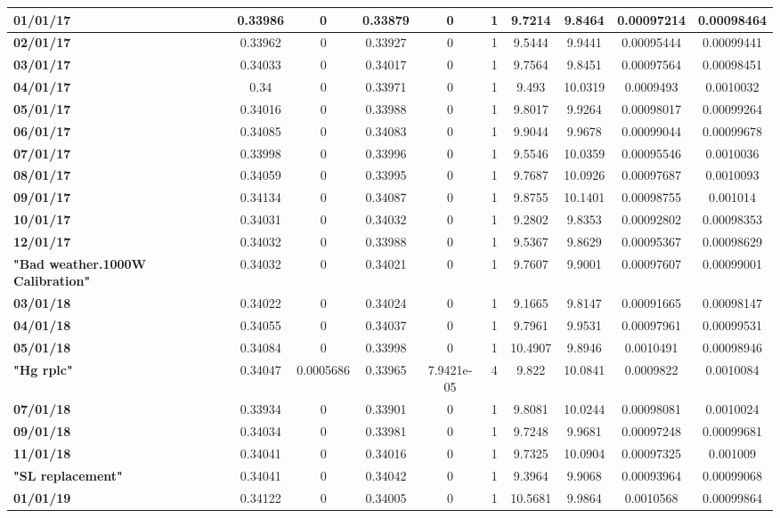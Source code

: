 {\begin{tabular}{lccccccccc}
\textbf{01/01/17}&0.33986&0&0.33879&0&1&9.7214&9.8464&0.00097214&0.00098464\\\midrule
\textbf{02/01/17}&0.33962&0&0.33927&0&1&9.5444&9.9441&0.00095444&0.00099441\\\midrule
\textbf{03/01/17}&0.34033&0&0.34017&0&1&9.7564&9.8451&0.00097564&0.00098451\\\midrule
\textbf{04/01/17}&0.34&0&0.33971&0&1&9.493&10.0319&0.0009493&0.0010032\\\midrule
\textbf{05/01/17}&0.34016&0&0.33988&0&1&9.8017&9.9264&0.00098017&0.00099264\\\midrule
\textbf{06/01/17}&0.34085&0&0.34083&0&1&9.9044&9.9678&0.00099044&0.00099678\\\midrule
\textbf{07/01/17}&0.33998&0&0.33996&0&1&9.5546&10.0359&0.00095546&0.0010036\\\midrule
\textbf{08/01/17}&0.34059&0&0.33995&0&1&9.7687&10.0926&0.00097687&0.0010093\\\midrule
\textbf{09/01/17}&0.34134&0&0.34087&0&1&9.8755&10.1401&0.00098755&0.001014\\\midrule
\textbf{10/01/17}&0.34031&0&0.34032&0&1&9.2802&9.8353&0.00092802&0.00098353\\\midrule
\textbf{12/01/17}&0.34032&0&0.33988&0&1&9.5367&9.8629&0.00095367&0.00098629\\\midrule
\textbf{"Bad weather.1000W Calibration"}&0.34032&0&0.34021&0&1&9.7607&9.9001&0.00097607&0.00099001\\\midrule
\textbf{03/01/18}&0.34022&0&0.34024&0&1&9.1665&9.8147&0.00091665&0.00098147\\\midrule
\textbf{04/01/18}&0.34055&0&0.34037&0&1&9.7961&9.9531&0.00097961&0.00099531\\\midrule
\textbf{05/01/18}&0.34084&0&0.33998&0&1&10.4907&9.8946&0.0010491&0.00098946\\\midrule
\textbf{"Hg rplc"}&0.34047&0.0005686&0.33965&7.9421e-05&4&9.822&10.0841&0.0009822&0.0010084\\\midrule
\textbf{07/01/18}&0.33934&0&0.33901&0&1&9.8081&10.0244&0.00098081&0.0010024\\\midrule
\textbf{09/01/18}&0.34034&0&0.33981&0&1&9.7248&9.9681&0.00097248&0.00099681\\\midrule
\textbf{11/01/18}&0.34041&0&0.34016&0&1&9.7325&10.0904&0.00097325&0.001009\\\midrule
\textbf{"SL replacement"}&0.34041&0&0.34042&0&1&9.3964&9.9068&0.00093964&0.00099068\\\midrule
\textbf{01/01/19}&0.34122&0&0.34005&0&1&10.5681&9.9864&0.0010568&0.00099864\\\midrule

\end{tabular}}
